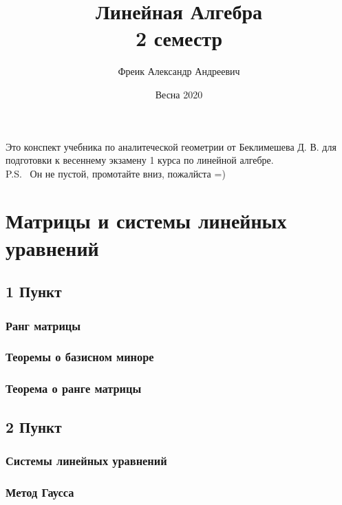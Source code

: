 \documentclass[11pt; a4paper]{report}
\theoremstyle{plain} %
\theoremstyle{defenition}
\theoremstyle{remark}
\begin{document}
 

\let\ms\mathscr  %
\let\ol\overline  %
\let\bs\boldsymbol
\let\ra\rightarrow
\let\b\begin
\let\e\end
\let\it\item
\let\subs\subsection

\large


\title{Линейная Алгебра\\ 2 семестр}
\author{Фреик Александр Андреевич} 
\date{Весна 2020}
\maketitle
Это конспект учебника по аналитеческой геометрии от Беклимешева Д. В. для подготовки к весеннему экзамену 1 курса по линейной алгебре.\\ 
P.S.  Он не пустой, промотайте вниз, пожалйста =)
\tableofcontents

\newpage
\chapter{Матрицы и системы линейных уравнений}
\section{\Large 1 Пункт}
\subsection{Ранг матрицы}
\subsection{Теоремы о базисном миноре}
\subsection{Теорема о ранге матрицы}

\newpage
\section{\Large 2 Пункт}
\subsection{Системы линейных уравнений}
\subsection{Метод Гаусса}
\end{document}
